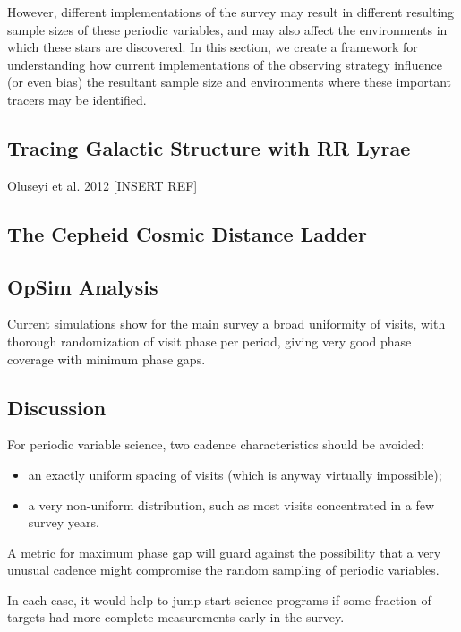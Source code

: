 However, different implementations of the survey may result in different resulting sample sizes of these periodic variables, and may also affect the environments in which these stars are discovered. In this section, we create a framework for understanding how current implementations of the observing strategy influence (or even bias) the resultant sample size and environments where these important tracers may be identified. 

\subsection{Tracing Galactic Structure with RR Lyrae}

Oluseyi et al. 2012 [INSERT REF] 



\subsection{The Cepheid Cosmic Distance Ladder}





\subsection{OpSim Analysis}
\label{sec:keyword:analysis}

Current simulations show for the main survey a broad uniformity of visits, with thorough randomization of visit phase per period, giving very good phase coverage with minimum phase gaps.



\subsection{Discussion}
\label{sec:keyword:discussion}

For periodic variable science, two cadence characteristics should be avoided:
\begin{itemize}
\item an exactly uniform spacing of visits (which is anyway virtually impossible); \
\item a very non-uniform distribution, such as most visits concentrated in a few survey years.
 \end{itemize}

A metric for maximum phase gap will guard against the possibility that a very unusual cadence might compromise the random sampling of periodic variables.

In each case, it would help to jump-start science programs if some fraction of targets had more complete measurements early in the survey.



\navigationbar
